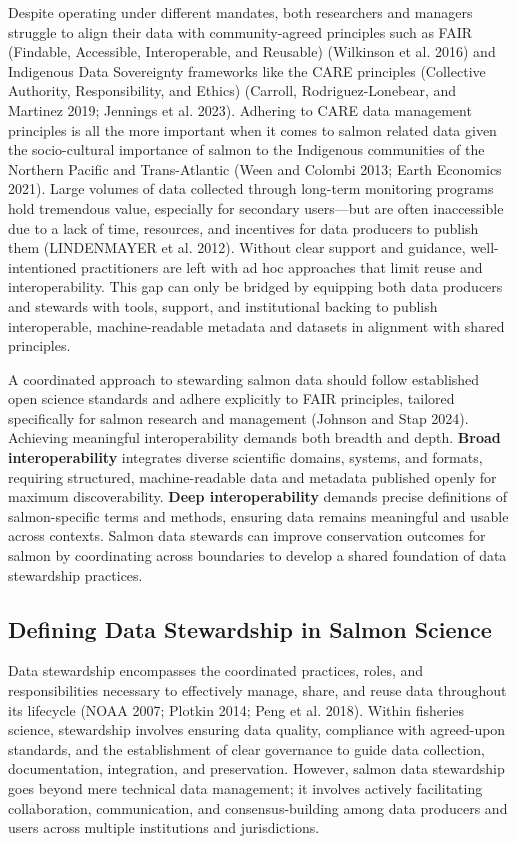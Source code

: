 \documentclass[
  letterpaper,
  DIV=11,
  numbers=noendperiod]{scrartcl}
\begin{document}
Despite operating under different mandates, both researchers and
managers struggle to align their data with community-agreed principles
such as FAIR (Findable, Accessible, Interoperable, and Reusable)
(Wilkinson et al. 2016) and Indigenous Data Sovereignty frameworks like
the CARE principles (Collective Authority, Responsibility, and Ethics)
(Carroll, Rodriguez-Lonebear, and Martinez 2019; Jennings et al. 2023).
Adhering to CARE data management principles is all the more important
when it comes to salmon related data given the socio-cultural importance
of salmon to the Indigenous communities of the Northern Pacific and
Trans-Atlantic (Ween and Colombi 2013; Earth Economics 2021). Large
volumes of data collected through long-term monitoring programs hold
tremendous value, especially for secondary users---but are often
inaccessible due to a lack of time, resources, and incentives for data
producers to publish them (LINDENMAYER et al. 2012). Without clear
support and guidance, well-intentioned practitioners are left with ad
hoc approaches that limit reuse and interoperability. This gap can only
be bridged by equipping both data producers and stewards with tools,
support, and institutional backing to publish interoperable,
machine-readable metadata and datasets in alignment with shared
principles.

A coordinated approach to stewarding salmon data should follow
established open science standards and adhere explicitly to FAIR
principles, tailored specifically for salmon research and management
(Johnson and Stap 2024). Achieving meaningful interoperability demands
both breadth and depth. \textbf{Broad interoperability} integrates
diverse scientific domains, systems, and formats, requiring structured,
machine-readable data and metadata published openly for maximum
discoverability. \textbf{Deep interoperability} demands precise
definitions of salmon-specific terms and methods, ensuring data remains
meaningful and usable across contexts. Salmon data stewards can improve
conservation outcomes for salmon by coordinating across boundaries to
develop a shared foundation of data stewardship practices.

\subsection{Defining Data Stewardship in Salmon
Science}\label{defining-data-stewardship-in-salmon-science}

Data stewardship encompasses the coordinated practices, roles, and
responsibilities necessary to effectively manage, share, and reuse data
throughout its lifecycle (NOAA 2007; Plotkin 2014; Peng et al. 2018).
Within fisheries science, stewardship involves ensuring data quality,
compliance with agreed-upon standards, and the establishment of clear
governance to guide data collection, documentation, integration, and
preservation. However, salmon data stewardship goes beyond mere
technical data management; it involves actively facilitating
collaboration, communication, and consensus-building among data
producers and users across multiple institutions and jurisdictions.
\end{document}
